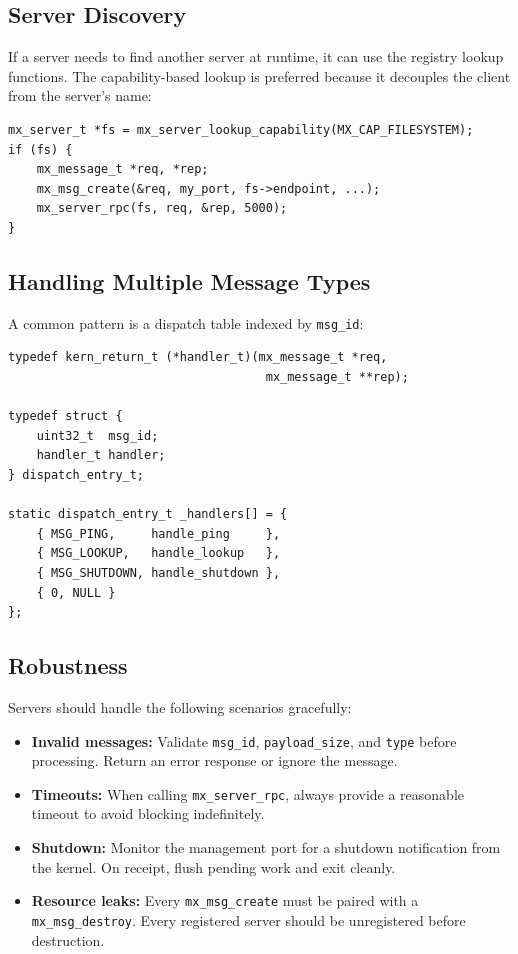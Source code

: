 \documentclass[a4paper,11pt]{article}
\begin{document}
\subsection{Server Discovery}

If a server needs to find another server at runtime, it can use the
registry lookup functions. The capability-based lookup is preferred
because it decouples the client from the server's name:

\begin{lstlisting}
mx_server_t *fs = mx_server_lookup_capability(MX_CAP_FILESYSTEM);
if (fs) {
    mx_message_t *req, *rep;
    mx_msg_create(&req, my_port, fs->endpoint, ...);
    mx_server_rpc(fs, req, &rep, 5000);
}
\end{lstlisting}

\subsection{Handling Multiple Message Types}

A common pattern is a dispatch table indexed by \texttt{msg\_id}:

\begin{lstlisting}
typedef kern_return_t (*handler_t)(mx_message_t *req,
                                    mx_message_t **rep);

typedef struct {
    uint32_t  msg_id;
    handler_t handler;
} dispatch_entry_t;

static dispatch_entry_t _handlers[] = {
    { MSG_PING,     handle_ping     },
    { MSG_LOOKUP,   handle_lookup   },
    { MSG_SHUTDOWN, handle_shutdown },
    { 0, NULL }
};
\end{lstlisting}

\subsection{Robustness}

Servers should handle the following scenarios gracefully:

\begin{itemize}
  \item \textbf{Invalid messages:} Validate \texttt{msg\_id},
    \texttt{payload\_size}, and \texttt{type} before processing.
    Return an error response or ignore the message.
  \item \textbf{Timeouts:} When calling \texttt{mx\_server\_rpc},
    always provide a reasonable timeout to avoid blocking
    indefinitely.
  \item \textbf{Shutdown:} Monitor the management port for a
    shutdown notification from the kernel. On receipt, flush
    pending work and exit cleanly.
  \item \textbf{Resource leaks:} Every \texttt{mx\_msg\_create}
    must be paired with a \texttt{mx\_msg\_destroy}. Every
    registered server should be unregistered before destruction.
\end{itemize}
\end{document}
